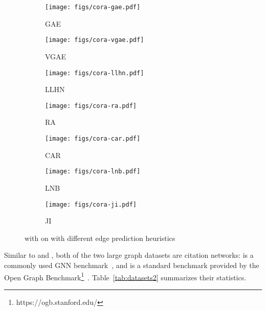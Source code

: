 \documentclass[letterpaper]{article} \usepackage{aaai21}  \usepackage{times}  \usepackage{helvet} \usepackage{courier}  \usepackage[hyphens]{url}  \usepackage{graphicx} \urlstyle{rm} \def\UrlFont{\rm}  \usepackage{natbib}  \usepackage{caption} \frenchspacing  \setlength{\pdfpagewidth}{8.5in}  \setlength{\pdfpageheight}{11in}
\begin{document}
\begin{figure*}[ht!]
    \centering
        \begin{subfigure}[b]{.2\linewidth}
          \texttt{[image: figs/cora-gae.pdf]}
            \caption{GAE}
        \end{subfigure}
        \begin{subfigure}[b]{.2\linewidth}
          \texttt{[image: figs/cora-vgae.pdf]}
            \caption{VGAE}
        \end{subfigure}
        \begin{subfigure}[b]{.2\linewidth}
            \texttt{[image: figs/cora-llhn.pdf]}
            \caption{LLHN}
        \end{subfigure}
        \begin{subfigure}[b]{.2\linewidth}
            \texttt{[image: figs/cora-ra.pdf]}
            \caption{RA}
        \end{subfigure}
        \begin{subfigure}[b]{.2\linewidth}
          \texttt{[image: figs/cora-car.pdf]}
            \caption{CAR}
        \end{subfigure}
        \begin{subfigure}[b]{.2\linewidth}
            \texttt{[image: figs/cora-lnb.pdf]}
            \caption{LNB}
        \end{subfigure}
        \begin{subfigure}[b]{.2\linewidth}
            \texttt{[image: figs/cora-ji.pdf]}
            \caption{JI}
        \end{subfigure}
    \caption{\methodtwo with \gcn on \cora with different edge prediction heuristics}\label{fig:heatmaps-cora}
\end{figure*}

Similar to \cora and \citeseer, both of the two large graph datasets are citation networks: \pubmed is a commonly used GNN benchmark~\cite{kipf2016semi}, and \ogbn is a standard benchmark provided by the Open Graph Benchmark\footnote{https://ogb.stanford.edu/}~\cite{hu2020open}. Table~\ref{tab:datasets2} summarizes their statistics.
\end{document}
